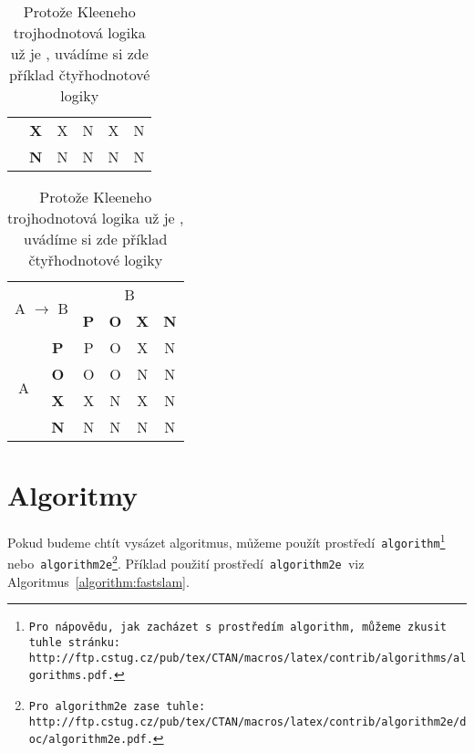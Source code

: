 \documentclass[a4paper, 11pt]{article}
\begin{document}
\begin{table}[h]
\begin{tabular}{|c|c|c|c|c|c|}
		                                                  & \textbf{X}             & X          & N          & X          & N \\ \cline{2-6}
		                                                  & \textbf{N}             & N          & N          & N          & N \\ \hline
	\end{tabular}
	\begin{tabular}{|c|c|c|c|c|c|}
		\hline
		\multicolumn{2}{|c|}{\multirow{2}{*}{A $\rightarrow$ B}} & \multicolumn{4}{c|}{B}                                            \\ \cline{3-6}
		\multicolumn{2}{|c|}{}                                   & \textbf{P}             & \textbf{O} & \textbf{X} & \textbf{N}     \\ \hline
		\multirow{4}{*}{A}                                       & \textbf{P}             & P          & O          & X          & N \\ \cline{2-6}
		                                                         & \textbf{O}             & O          & O          & N          & N \\ \cline{2-6}
		                                                         & \textbf{X}             & X          & N          & X          & N \\ \cline{2-6}
		                                                         & \textbf{N}             & N          & N          & N          & N \\ \hline
	\end{tabular}
	\caption{
		Protože Kleeneho trojhodnotová logika už je , uvádíme si zde
		příklad čtyřhodnotové logiky
	}
	\label{table:logika}
\end{table}
\bigskip
{}
\pagebreak
\section{Algoritmy}\label{section:algoritmy}
Pokud budeme chtít vysázet algoritmus, můžeme použít prostředí\texttt{ algorithm\footnote{
		Pro nápovědu, jak zacházet s~prostředím\texttt{ algorithm,} můžeme zkusit tuhle stránku: \\
		http://ftp.cstug.cz/pub/tex/CTAN/macros/latex/contrib/algorithms/algorithms.pdf.
	} }
nebo\texttt{ algorithm2e\footnote{
		Pro\texttt{ algorithm2e }zase tuhle:
		http://ftp.cstug.cz/pub/tex/CTAN/macros/latex/contrib/algorithm2e/doc/algorithm2e.pdf.
	}}. Příklad použití prostředí\texttt{ algorithm2e }viz Algoritmus~\ref{algorithm:fastslam}. \\
\IncMargin{1.5em}
\end{document}
